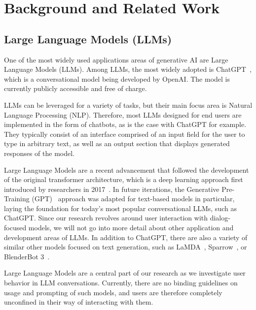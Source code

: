 \section{Background and Related Work}
\label{sec:background-and-related-work}


\subsection{Large Language Models (LLMs)}
\label{subsec:large-language-models-(llms)}
One of the most widely used applications areas of generative AI are Large Language Models (LLMs).
Among LLMs, the most widely adopted is ChatGPT~\cite{openai_chatgpt_2023}, which is a
conversational model being developed by OpenAI\@.
The model is currently publicly accessible and free of charge.

LLMs can be leveraged for a variety of tasks, but their main focus area is Natural Language Processing
(NLP).
Therefore, most LLMs designed for end users are implemented in the form of chatbots,
as is the case with ChatGPT for example.
They typically consist of an interface comprised of an input field for the user to type in arbitrary
text, as well as an output section that displays generated responses of the model.

Large Language Models are a recent advancement that followed the development of the original
transformer architecture, which is a deep learning approach first introduced by researchers in 2017~\cite{vaswani_attention_2017}.
In future iterations, the Generative Pre-Training (GPT)~\cite{radford_improving_2018} approach
was adapted for text-based models in particular, laying the foundation for today's most
popular conversational LLMs, such as ChatGPT\@.
Since our research revolves around user interaction with dialog-focused models, we will not go into
more detail about other application and development areas of LLMs.
In addition to ChatGPT, there are also a variety of similar other models focused on text generation,
such as LaMDA~\cite{thoppilan_lamda_2022}, Sparrow~\cite{glaese_improving_2022}, or
BlenderBot 3~\cite{shuster_blenderbot_2022}.


Large Language Models are a central part of our research as we investigate user behavior in LLM
conversations.
Currently, there are no binding guidelines on usage and prompting of such models,
and users are therefore completely unconfined in their way of interacting with them.

